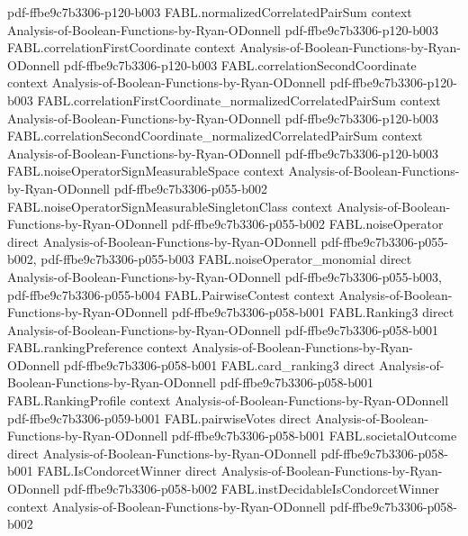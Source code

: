 \begin{theorem}
  {pdf-ffbe9c7b3306-p120-b003}
\proofstep
  {FABL.normalizedCorrelatedPairSum}
  {context}
  {Analysis-of-Boolean-Functions-by-Ryan-ODonnell}
  {pdf-ffbe9c7b3306-p120-b003}
\proofstep
  {FABL.correlationFirstCoordinate}
  {context}
  {Analysis-of-Boolean-Functions-by-Ryan-ODonnell}
  {pdf-ffbe9c7b3306-p120-b003}
\proofstep
  {FABL.correlationSecondCoordinate}
  {context}
  {Analysis-of-Boolean-Functions-by-Ryan-ODonnell}
  {pdf-ffbe9c7b3306-p120-b003}
\proofstep
  {FABL.correlationFirstCoordinate_normalizedCorrelatedPairSum}
  {context}
  {Analysis-of-Boolean-Functions-by-Ryan-ODonnell}
  {pdf-ffbe9c7b3306-p120-b003}
\proofstep
  {FABL.correlationSecondCoordinate_normalizedCorrelatedPairSum}
  {context}
  {Analysis-of-Boolean-Functions-by-Ryan-ODonnell}
  {pdf-ffbe9c7b3306-p120-b003}
\proofstep
  {FABL.noiseOperatorSignMeasurableSpace}
  {context}
  {Analysis-of-Boolean-Functions-by-Ryan-ODonnell}
  {pdf-ffbe9c7b3306-p055-b002}
\proofstep
  {FABL.noiseOperatorSignMeasurableSingletonClass}
  {context}
  {Analysis-of-Boolean-Functions-by-Ryan-ODonnell}
  {pdf-ffbe9c7b3306-p055-b002}
\proofstep
  {FABL.noiseOperator}
  {direct}
  {Analysis-of-Boolean-Functions-by-Ryan-ODonnell}
  {pdf-ffbe9c7b3306-p055-b002,
    pdf-ffbe9c7b3306-p055-b003}
\proofstep
  {FABL.noiseOperator_monomial}
  {direct}
  {Analysis-of-Boolean-Functions-by-Ryan-ODonnell}
  {pdf-ffbe9c7b3306-p055-b003,
    pdf-ffbe9c7b3306-p055-b004}
\proofstep
  {FABL.PairwiseContest}
  {context}
  {Analysis-of-Boolean-Functions-by-Ryan-ODonnell}
  {pdf-ffbe9c7b3306-p058-b001}
\proofstep
  {FABL.Ranking3}
  {direct}
  {Analysis-of-Boolean-Functions-by-Ryan-ODonnell}
  {pdf-ffbe9c7b3306-p058-b001}
\proofstep
  {FABL.rankingPreference}
  {context}
  {Analysis-of-Boolean-Functions-by-Ryan-ODonnell}
  {pdf-ffbe9c7b3306-p058-b001}
\proofstep
  {FABL.card_ranking3}
  {direct}
  {Analysis-of-Boolean-Functions-by-Ryan-ODonnell}
  {pdf-ffbe9c7b3306-p058-b001}
\proofstep
  {FABL.RankingProfile}
  {context}
  {Analysis-of-Boolean-Functions-by-Ryan-ODonnell}
  {pdf-ffbe9c7b3306-p059-b001}
\proofstep
  {FABL.pairwiseVotes}
  {direct}
  {Analysis-of-Boolean-Functions-by-Ryan-ODonnell}
  {pdf-ffbe9c7b3306-p058-b001}
\proofstep
  {FABL.societalOutcome}
  {direct}
  {Analysis-of-Boolean-Functions-by-Ryan-ODonnell}
  {pdf-ffbe9c7b3306-p058-b001}
\proofstep
  {FABL.IsCondorcetWinner}
  {direct}
  {Analysis-of-Boolean-Functions-by-Ryan-ODonnell}
  {pdf-ffbe9c7b3306-p058-b002}
\proofstep
  {FABL.instDecidableIsCondorcetWinner}
  {context}
  {Analysis-of-Boolean-Functions-by-Ryan-ODonnell}
  {pdf-ffbe9c7b3306-p058-b002}
\proofstep

\end{theorem}
